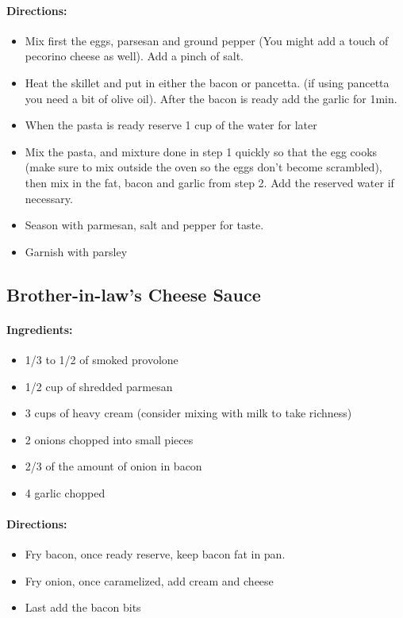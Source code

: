 \documentclass{article}
\begin{document}
\paragraph{Directions:}
\begin{itemize}
    \item Mix first the eggs, parsesan and ground pepper (You might add a touch of pecorino cheese as well). Add a pinch of salt.
    \item Heat the skillet and put in either the bacon or pancetta. (if using pancetta you need a bit of olive oil). After the bacon is ready add the garlic for 1min.
    \item When the pasta is ready reserve 1 cup of the water for later
    \item Mix the pasta, and mixture done in step 1 quickly so that the egg cooks (make sure to mix outside the oven so the eggs don’t become scrambled), then mix in the fat, bacon and garlic from step 2. Add the reserved water if necessary.
    \item Season with parmesan, salt and pepper for taste.
    \item Garnish with parsley
\end{itemize}

\subsection{Brother-in-law’s Cheese Sauce}

\paragraph{Ingredients:}
\begin{itemize}
    \item 1/3 to 1/2 of smoked provolone
    \item 1/2 cup of shredded parmesan
    \item 3 cups of heavy cream (consider mixing with milk to take richness)
    \item 2 onions chopped into small pieces
    \item 2/3 of the amount of onion in bacon
    \item 4 garlic chopped
\end{itemize}

\paragraph{Directions:}
\begin{itemize}
    \item Fry bacon, once ready reserve, keep bacon fat in pan.
    \item Fry onion, once caramelized, add cream and cheese
    \item Last add the bacon bits
\end{itemize}
\end{document}
